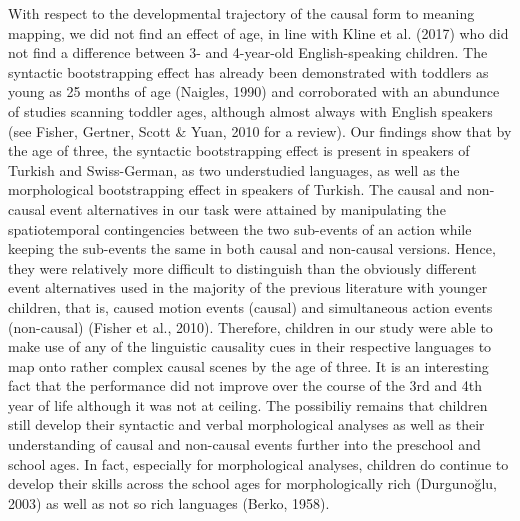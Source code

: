 \documentclass[man]{apa6}
\begin{document}
With respect to the developmental trajectory of the causal form to
meaning mapping, we did not find an effect of age, in line with Kline et
al. (2017) who did not find a difference between 3- and 4-year-old
English-speaking children. The syntactic bootstrapping effect has
already been demonstrated with toddlers as young as 25 months of age (Naigles, 1990) and corroborated with an abundunce of studies scanning
toddler ages, although almost always with English speakers (see Fisher,
Gertner, Scott \& Yuan, 2010 for a review). Our findings show that by
the age of three, the syntactic bootstrapping effect is present in
speakers of Turkish and Swiss-German, as two understudied languages, as
well as the morphological bootstrapping effect in speakers of Turkish.
The causal and non-causal event alternatives in our task were attained
by manipulating the spatiotemporal contingencies between the two
sub-events of an action while keeping the sub-events the same in both causal
and non-causal versions. Hence, they were relatively more difficult to
distinguish than the obviously different event alternatives used in the
majority of the previous literature with younger children, that is,
caused motion events (causal) and simultaneous action events
(non-causal) (Fisher et al., 2010). Therefore, children in our study
were able to make use of any of the linguistic causality cues in their
respective languages to map onto rather complex causal scenes by the age
of three. It is an interesting fact that the performance did not improve
over the course of the 3rd and 4th year of life although it was not at
ceiling. The possibiliy remains that children still develop their
syntactic and verbal morphological analyses as well as their
understanding of causal and non-causal events further into the preschool
and school ages. In fact, especially for morphological analyses,
children do continue to develop their skills across the school ages for
morphologically rich (Durgunoğlu, 2003) as well as not so rich languages
(Berko, 1958).
\end{document}
